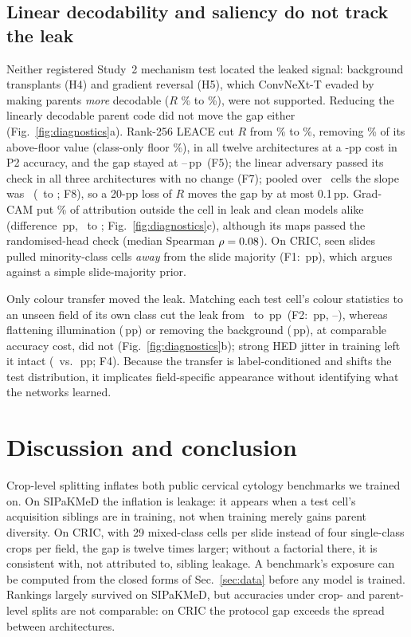 \documentclass{article}
\newcommand{\pp}{\,pp}
\begin{document}
\subsection{Linear decodability and saliency do not track the leak}
\label{sec:res-diagnostics}

Neither registered Study~2 mechanism test located the leaked signal: background transplants (H4) and gradient reversal (H5), which ConvNeXt-T evaded by making parents \emph{more} decodable ($R$ \GrlConvRzero\% to \GrlConvRstar\%), were not supported. Reducing the linearly decodable parent code did not move the gap either (Fig.~\ref{fig:diagnostics}a). Rank-256 LEACE cut $R$ from \LeaceRzero\% to \LeaceRtop\%, removing \LeaceAboveFloorCut\% of its above-floor value (class-only floor \RFloor\%), in all twelve architectures at a \LeaceAccDrop-pp cost in P2 accuracy, and the gap stayed at \LeaceGapZero--\LeaceGapTop\pp\ (F5); the linear adversary passed its check in all three architectures with no change (F7); pooled over \FeightCells\ cells the slope was \FeightEst\ (\FeightLo\ to \FeightHi; F8), so a 20-pp loss of $R$ moves the gap by at most 0.1\pp. Grad-CAM put \CamBgAttribution\% of attribution outside the cell in leak and clean models alike (difference \CamLeakEst\pp, \CamLeakLo\ to \CamLeakHi; Fig.~\ref{fig:diagnostics}c), although its maps passed the randomised-head check (median Spearman $\rho=0.08$). On CRIC, seen slides pulled minority-class cells \emph{away} from the slide majority (F1: \FoneEst\pp), which argues against a simple slide-majority prior.

Only colour transfer moved the leak. Matching each test cell's colour statistics to an unseen field of its own class cut the leak from \LeakUnderOriginal\ to \LeakUnderStain\pp\ (F2: \FtwoEst\pp, \FtwoLo--\FtwoHi), whereas flattening illumination (\LeakUnderFlat\pp) or removing the background (\LeakUnderBg\pp), at comparable accuracy cost, did not (Fig.~\ref{fig:diagnostics}b); strong HED jitter in training left it intact (\CarrierColour\ vs.\ \CarrierStandard\pp; F4). Because the transfer is label-conditioned and shifts the test distribution, it implicates field-specific appearance without identifying what the networks learned.

\section{Discussion and conclusion}
\label{sec:discussion}

Crop-level splitting inflates both public cervical cytology benchmarks we trained on. On SIPaKMeD the inflation is leakage: it appears when a test cell's acquisition siblings are in training, not when training merely gains parent diversity. On CRIC, with 29 mixed-class cells per slide instead of four single-class crops per field, the gap is twelve times larger; without a factorial there, it is consistent with, not attributed to, sibling leakage. A benchmark's exposure can be computed from the closed forms of Sec.~\ref{sec:data} before any model is trained. Rankings largely survived on SIPaKMeD, but accuracies under crop- and parent-level splits are not comparable: on CRIC the protocol gap exceeds the spread between architectures.
\end{document}
